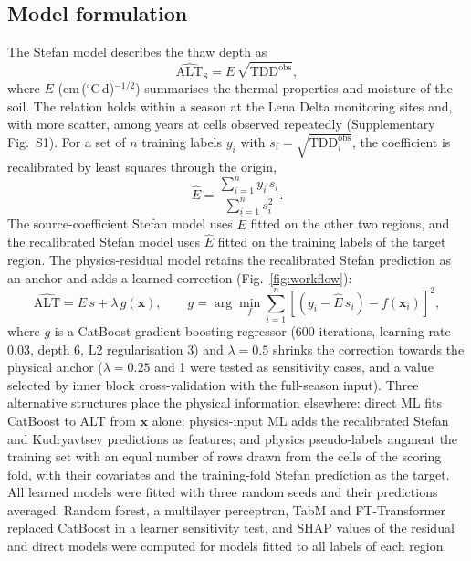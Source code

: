 \subsection{Model formulation}
The Stefan model describes the thaw depth as
\begin{equation}
\widehat{\mathrm{ALT}}_{\mathrm{S}} = E\,\sqrt{\mathrm{TDD}^{\mathrm{obs}}},
\label{eq:stefan}
\end{equation}
where $E$ (cm\,($^\circ$C\,d)$^{-1/2}$) summarises the thermal properties and moisture of the soil\cite{Stefan1891,Riseborough2008}. The relation holds within a season at the Lena Delta monitoring sites and, with more scatter, among years at cells observed repeatedly (Supplementary Fig.~S1). For a set of $n$ training labels $y_i$ with $s_i = \sqrt{\mathrm{TDD}^{\mathrm{obs}}_i}$, the coefficient is recalibrated by least squares through the origin,
\begin{equation}
\hat{E} = \frac{\sum_{i=1}^{n} y_i\, s_i}{\sum_{i=1}^{n} s_i^{2}}.
\label{eq:E}
\end{equation}
The source-coefficient Stefan model uses $\hat{E}$ fitted on the other two regions, and the recalibrated Stefan model uses $\hat{E}$ fitted on the training labels of the target region. The physics-residual model retains the recalibrated Stefan prediction as an anchor and adds a learned correction (Fig.~\ref{fig:workflow}):
\begin{equation}
\widehat{\mathrm{ALT}} = \hat{E}\, s + \lambda\, g(\mathbf{x}), \qquad g = \arg\min_{f} \sum_{i=1}^{n} \left[ \left( y_i - \hat{E}\, s_i \right) - f(\mathbf{x}_i) \right]^{2},
\label{eq:residual}
\end{equation}
where $g$ is a CatBoost gradient-boosting regressor\cite{Prokhorenkova2018} (600 iterations, learning rate 0.03, depth 6, L2 regularisation 3) and $\lambda=0.5$ shrinks the correction towards the physical anchor ($\lambda = 0.25$ and 1 were tested as sensitivity cases, and a value selected by inner block cross-validation with the full-season input). Three alternative structures place the physical information elsewhere: direct ML fits CatBoost to ALT from $\mathbf{x}$ alone; physics-input ML adds the recalibrated Stefan and Kudryavtsev\cite{Kudryavtsev1974} predictions as features; and physics pseudo-labels augment the training set with an equal number of rows drawn from the cells of the scoring fold, with their covariates and the training-fold Stefan prediction as the target. All learned models were fitted with three random seeds and their predictions averaged. Random forest, a multilayer perceptron, TabM and FT-Transformer\cite{Gorishniy2021,Gorishniy2025,Holzmuller2024} replaced CatBoost in a learner sensitivity test, and SHAP values\cite{Lundberg2017} of the residual and direct models were computed for models fitted to all labels of each region.

